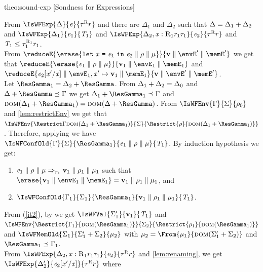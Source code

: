 \begin{proofOf}{theo:sound-exp} [Sondness for Expressions]
\begin{description}
From $\IsWFExp{\Delta}{\e}{\Graded{\tau}{\Rgr}{\rgr}}$ and  
 there are $\Delta_1$ and $\Delta_2$  such that  
$\Delta=\Delta_1+\Delta_2$ and $\IsWFExp{\Delta_1}{\e_1}{\T_1}$ and $\IsWFExp{\Delta_2,\CtxElem{\x}{\Rgr_1}{\rgr_1}{\tau_1}}{\e_2}{\Graded{\tau}{\Rgr}{\rgr}}$ and
$\mathit{T}_1\leq\tau_1^{\textsc{R}_1}{r_1}$.\\
From $\reduceE{\erase{\Conf{\Let{\x}{\e_1}{\e_2}}{\env}{\mem}}}{{\Conf{\val}{\envE'}{\memE'}}}$ we get that 
$\reduceE{\erase{\Conf{\e_1}{\env}{\mem}}}{\Conf{\val_1}{\envE_1}{\memE_1}}$ and 
$\reduceE{{\Conf{\Subst{\e_2}{\x'}{\x}}{{\envE_1},\x'\mapsto\val_1}{\memE_1}}}{{\Conf{\val}{\envE'}{\memE'}}}$.\\
%
Let $\ResGamma_1=\Delta_2\ctxsum\ResGamma$.  From $\Delta_1+\Delta_2=\Delta_0$ and $\Delta\ctxsum\ResGamma\ctxord\Gamma$
we get $\Delta_1\ctxsum\ResGamma_1\ctxord\Gamma$ and $\dom{\Delta_1\ctxsum\ResGamma_1}=\dom{\Delta\ctxsum\ResGamma}$.
From  $\IsWFEnv{\Gamma}{\Sigma}{\env_0}$ and \cref{lem:restrictEnv} we get that   $\IsWFEnv{\Restrict\Gamma{\dom{\Delta_1\ctxsum\ResGamma_1}}}{\Sigma}{\Restrict{\env}{\dom{\Delta_1\ctxsum\ResGamma_1}}}$. Therefore,
applying  we have $\IsWFConfOld{\Gamma}{\Sigma}{\ResGamma_1}{\Conf{\e_1}{\env}{\mem}}{\T_1}$. By induction hypothesis
we get:
\begin{enumerate}
\item \label{it1} $\mathit{e}_1\parallel\rho\parallel\mu\Rightarrow_{r_1}\mathbf{v}_1\parallel\rho_1\parallel\mu_1$ such that $\erase{\Conf{\val_1}{\envE_1}{\memE_1}}=\Conf{\val_1}{\env_1}{\mem_1}$, and 
\item \label{it2} $\IsWFConfOld{\Gamma_1}{\Sigma_1}{\ResGamma_1}{\Conf{\val_1}{\env_1}{\mem_1}}{\T_1}$. %
\end{enumerate}
%
From (\ref{it2}), by  we get  $\IsWFVal{\Sigma'_1}{\val_1}{\T_1}$ and
$\IsWFEnv{\Restrict{{\Gamma_1}}{\dom{\ResGamma_1}}}{\Sigma_2}{\Restrict{{\env_1}}{\dom{\ResGamma_1}}}$ and 
$\IsWFMemOld{\Sigma_1}{\Sigma'_1\ctxsum\Sigma_2}{\mem_2}$ with $\mem_2=\From{{\mem_1}}{\dom{\Sigma'_1\ctxsum\Sigma_2}}$
and $\ResGamma_1\ctxord\Gamma_1$.\\
%
From  $\IsWFExp{\Delta_2,\CtxElem{\x}{\Rgr_1}{\rgr_1}{\tau_1}}{\e_2}{\Graded{\tau}{\Rgr}{\rgr}}$ and \cref{lem:renaming}, we get  $\IsWFExp{\Delta'_2}{\Subst{\e_2}{\x'}{\x}}{\Graded{\tau}{\Rgr}{\rgr}}$ where 

\end{description}
\end{proofOf}
